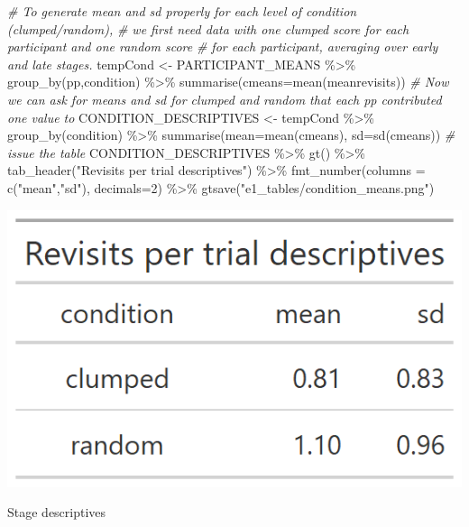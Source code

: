 \documentclass[
]{book}
\newenvironment{Shaded}{\begin{snugshade}}{\end{snugshade}}
\newcommand{\AttributeTok}[1]{\textcolor[rgb]{0.77,0.63,0.00}{#1}}
\newcommand{\CommentTok}[1]{\textcolor[rgb]{0.56,0.35,0.01}{\textit{#1}}}
\newcommand{\DecValTok}[1]{\textcolor[rgb]{0.00,0.00,0.81}{#1}}
\newcommand{\FunctionTok}[1]{\textcolor[rgb]{0.00,0.00,0.00}{#1}}
\newcommand{\NormalTok}[1]{#1}
\newcommand{\OtherTok}[1]{\textcolor[rgb]{0.56,0.35,0.01}{#1}}
\newcommand{\SpecialCharTok}[1]{\textcolor[rgb]{0.00,0.00,0.00}{#1}}
\newcommand{\StringTok}[1]{\textcolor[rgb]{0.31,0.60,0.02}{#1}}
\begin{document}
\begin{Shaded}
\begin{Highlighting}[]
\CommentTok{\# To generate mean and sd properly for each level of condition (clumped/random), }
\CommentTok{\# we first need data with one clumped score for each participant and one random score }
\CommentTok{\# for each participant, averaging over early and late stages.}
\NormalTok{tempCond }\OtherTok{\textless{}{-}}\NormalTok{ PARTICIPANT\_MEANS }\SpecialCharTok{\%\textgreater{}\%} \FunctionTok{group\_by}\NormalTok{(pp,condition) }\SpecialCharTok{\%\textgreater{}\%} \FunctionTok{summarise}\NormalTok{(}\AttributeTok{cmeans=}\FunctionTok{mean}\NormalTok{(meanrevisits))}
\CommentTok{\# Now we can ask for means and sd for clumped and random that each pp contributed one value to}
\NormalTok{CONDITION\_DESCRIPTIVES }\OtherTok{\textless{}{-}}\NormalTok{ tempCond }\SpecialCharTok{\%\textgreater{}\%} \FunctionTok{group\_by}\NormalTok{(condition) }\SpecialCharTok{\%\textgreater{}\%} \FunctionTok{summarise}\NormalTok{(}\AttributeTok{mean=}\FunctionTok{mean}\NormalTok{(cmeans), }\AttributeTok{sd=}\FunctionTok{sd}\NormalTok{(cmeans))}
\CommentTok{\# issue the table}
\NormalTok{CONDITION\_DESCRIPTIVES }\SpecialCharTok{\%\textgreater{}\%} 
  \FunctionTok{gt}\NormalTok{() }\SpecialCharTok{\%\textgreater{}\%} 
  \FunctionTok{tab\_header}\NormalTok{(}\StringTok{"Revisits per trial descriptives"}\NormalTok{) }\SpecialCharTok{\%\textgreater{}\%} 
  \FunctionTok{fmt\_number}\NormalTok{(}\AttributeTok{columns =} \FunctionTok{c}\NormalTok{(}\StringTok{"mean"}\NormalTok{,}\StringTok{"sd"}\NormalTok{), }\AttributeTok{decimals=}\DecValTok{2}\NormalTok{) }\SpecialCharTok{\%\textgreater{}\%} 
  \FunctionTok{gtsave}\NormalTok{(}\StringTok{"e1\_tables/condition\_means.png"}\NormalTok{)}
\end{Highlighting}
\end{Shaded}

\includegraphics[width=0.33\linewidth]{e1_figures/CONDITION_DESCRIPTIVES-1}

Stage descriptives
\end{document}
